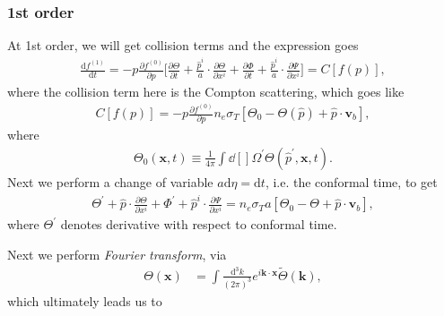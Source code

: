\documentclass[a4paper, 12pt]{article}
\begin{document}
{{          \subsubsection{1st order}%
            \label{sub:1st order}
            At 1st order, we will get collision terms and the
            expression goes 
            \begin{align}
              \label{1st order of boltzmann}
              \frac{\mathrm{d}f^{(1)} }{\mathrm{d}t} = - p
              \frac{\partial f^{(0)} }{\partial p} \bigg[
              \frac{\partial \Theta}{\partial t} +
              \frac{\hat{p}^{i} }{a} \cdot \frac{\partial
              \Theta}{\partial x^{i} } + \frac{\partial
              \Phi}{\partial t} + \frac{\hat{p}^{i} }{a}\cdot
              \frac{\partial \Psi}{\partial x^{i} }  \bigg] =
              C[f(p)],
            \end{align} where the collision term here is the
            Compton scattering, which goes like 
            \begin{align}
              \label{compton scattering} 
              C[f(p)] = - p \frac{\partial f^{(0)} }{\partial p}
              n_{e} \sigma_{T}[\Theta_{0} - \Theta(\hat{p}) +
              \hat{p}\cdot \textbf{v}_{b}],
            \end{align} where 
            \begin{align}
              \label{theta0}
              \Theta_{0}(\textbf{x},t) \equiv \frac{1}{4 \pi}
              \int \dd[]{\Omega^{\prime} } \Theta (
              \hat{p}^{\prime}, \textbf{x},t).
            \end{align}
        Next we perform a change of variable \( a \mathrm{d} \eta
        = \mathrm{d}t\), i.e. the conformal time, to get 
        \begin{align}
          \label{change of var on 1st order of boltzmann}
          \Theta^{\prime} + \hat{p} \cdot \frac{\partial
          \Theta}{\partial x^{i} } + \Phi^{\prime} + \hat{p}^{i}
          \cdot \frac{\partial \Psi}{\partial x^{i} } = n_{e}
          \sigma_{T} a [\Theta_{0} - \Theta + \hat{p} \cdot
          \textbf{v}_{b}], 
        \end{align} where \( \Theta^{\prime} \) denotes
        derivative with respect to conformal time. 

        Next we perform \textit{Fourier transform}, via 
        \begin{align}
          \label{fourier transform on Theta}
          \Theta(\textbf{x}) &= \int \frac{\mathrm{d}^{3} k}{(2
          \pi)^{3}} e^{i \textbf{k} \cdot \textbf{x}}
          \tilde{\Theta}(\textbf{k}), 
        \end{align} which ultimately leads us to 

}}
\end{document}
